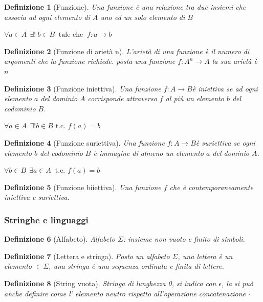 \documentclass[a4paper]{article}
\newtheorem*{definition}{Definizione}
\begin{document}
\begin{definition}[Funzione]Una funzione è una relazione tra due insiemi che associa ad ogni elemento di $A$ uno ed un solo elemento di $B$
\begin{center}$\forall a \in A \ \ \exists  ! \ b \in B \ \mbox{ tale che } \ f:a\to b$\end{center}
\end{definition}
\begin{definition}[Funzione  di arietà n]L'arietà di una funzione è il numero di argomenti che la funzione richiede. posta una funzione $f : A^{n} \rightarrow A$ la sua arietà è $n$ 
\end{definition}
\begin{definition}[Funzione iniettiva]Una funzione $f : A \rightarrow B $è iniettiva se ad ogni elemento $a$ del dominio $A$ corrisponde attraverso $f$ al più un elemento $b$ del codominio $B$.
	\begin{center}$\forall a\in A\ \ \exists! b\in B \mbox{ t.c. }f(a)=b$\end{center}
\end{definition}
\begin{definition}[Funzione suriettiva]Una funzione $f : A \rightarrow B $è suriettiva se ogni elemento $b$ del codominio $B$ è immagine di almeno un elemento $a$ del dominio $A$.
	\begin{center}$\forall b\in B\ \ \exists a\in A\ \mbox{ t.c. }f(a)=b$\end{center}
\end{definition}
\begin{definition}[Funzione biiettiva]Una funzione $f$ che è contemporaneamente iniettiva e suriettiva.
\end{definition}

\subsubsection{Stringhe e linguaggi}

\begin{definition}[Alfabeto]Alfabeto $\Sigma$: insieme non vuoto e finito di simboli.
\end{definition}

\begin{definition}[Lettera e stringa]Posto un alfabeto $\Sigma$, una lettera è un elemento $\in \Sigma$, una stringa è una sequenza ordinata e finita di lettere.
\end{definition}

\begin{definition}[String vuota]Stringa di lunghezza 0, si indica con $\epsilon$, la si può anche definire come l' elemento neutro rispetto all'operazione concatenazione $\cdot$
\end{definition}
\end{document}
